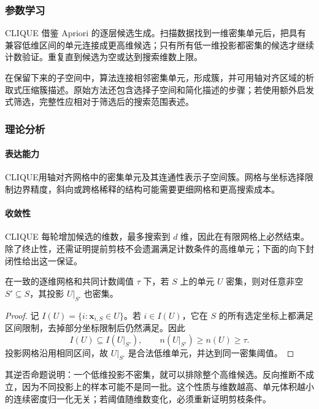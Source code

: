 \subsubsection{参数学习}

CLIQUE 借鉴 Apriori 的逐层候选生成。扫描数据找到一维密集单元后，把具有兼容低维区间的单元连接成更高维候选；只有所有低一维投影都密集的候选才继续计数验证。重复直到候选为空或达到搜索维数上限。

在保留下来的子空间中，算法连接相邻密集单元，形成簇，并可用轴对齐区域的析取式压缩簇描述。原始方法还包含选择子空间和简化描述的步骤；若使用额外启发式筛选，完整性应相对于筛选后的搜索范围表述。

\subsubsection{理论分析}

\paragraph{表达能力}
CLIQUE用轴对齐网格中的密集单元及其连通性表示子空间簇。网格与坐标选择限制边界精度，斜向或跨格稀释的结构可能需要更细网格和更高搜索成本。

\paragraph{收敛性}
CLIQUE 每轮增加候选的维数，最多搜索到 $d$ 维，因此在有限网格上必然结束。除了终止性，还需证明提前剪枝不会遗漏满足计数条件的高维单元；下面的向下封闭性给出这一保证。

\begin{theorem}[子空间密集性的向下封闭性]
 \label{thm:clustering-clique}
 在一致的逐维网格和共同计数阈值 $\tau$ 下，若 $S$ 上的单元 $U$ 密集，则对任意非空 $S'\subseteq S$，其投影 $U|_{S'}$ 也密集。
\end{theorem}
\begin{proof}
记 $I(U)=\{i:\bm{x}_{i,S}\in U\}$。若 $i\in I(U)$，它在 $S$ 的所有选定坐标上都满足区间限制，去掉部分坐标限制后仍然满足。因此
\[
 I(U)\subseteq I(U|_{S'}),\qquad
 n(U|_{S'})\geq n(U)\geq\tau.
\]
投影网格沿用相同区间，故 $U|_{S'}$ 是合法低维单元，并达到同一密集阈值。
\end{proof}

其逆否命题说明：一个低维投影不密集，就可以排除整个高维候选。反向推断不成立，因为不同投影上的样本可能不是同一批。这个性质与维数越高、单元体积越小的连续密度归一化无关；若阈值随维数变化，必须重新证明剪枝条件。

